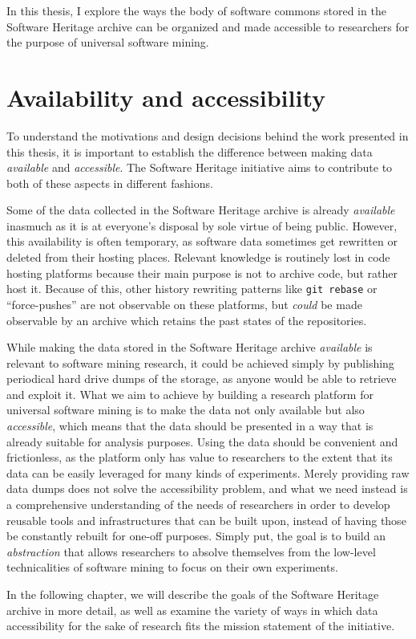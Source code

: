 In this thesis, I explore the ways the body of software commons stored in the
Software Heritage archive can be organized and made accessible to researchers
for the purpose of universal software mining.

\section{Availability and accessibility}

To understand the motivations and design decisions behind the work presented in
this thesis, it is important to establish the difference between making data
\emph{available} and \emph{accessible}.  The Software Heritage initiative aims
to contribute to both of these aspects in different fashions.

Some of the data collected in the Software Heritage archive is already
\emph{available} inasmuch as it is at everyone's disposal by sole virtue of
being public. However, this availability is often temporary, as software data
sometimes get rewritten or deleted from their hosting places. Relevant
knowledge is routinely lost in code hosting platforms because their main
purpose is not to archive code, but rather host it. Because of this, other
history rewriting patterns like \texttt{git rebase} or ``force-pushes'' are not
observable on these platforms, but \emph{could} be made observable by an
archive which retains the past states of the repositories.

While making the data stored in the Software Heritage archive \emph{available}
is relevant to software mining research, it could be achieved simply by
publishing periodical hard drive dumps of the storage, as anyone would be able
to retrieve and exploit it.
What we aim to achieve by building a research platform for universal software
mining is to make the data not only available but also \emph{accessible}, which
means that the data should be presented in a way that is already suitable for
analysis purposes. Using the data should be convenient and frictionless,
as the platform only has value to researchers to the extent that its data can
be easily leveraged for many kinds of experiments. Merely providing raw data
dumps does not solve the accessibility problem, and what we need instead is a
comprehensive understanding of the needs of researchers in order to develop
reusable tools and infrastructures that can be built upon, instead of having
those be constantly rebuilt for one-off purposes. Simply put, the goal is to
build an \emph{abstraction} that allows researchers to absolve themselves from
the low-level technicalities of software mining to focus on their own
experiments.

In the following chapter, we will describe the goals of the Software Heritage
archive in more detail, as well as examine the variety of ways in which data
accessibility for the sake of research fits the mission statement of the
initiative.
